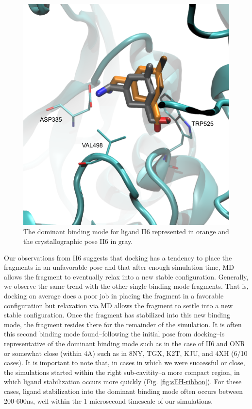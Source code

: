 \begin{figure}
    \centering
    \includegraphics[width=\linewidth]{chapter5/II6/BR-II6_1-pcca2-CL.png}
    \caption[Ligand II6 with crystal structure]{The dominant binding mode for ligand II6 represented in orange and the crystallographic pose II6 in gray.}
    \label{fig:II6_pcca2}
\end{figure}

Our observations from II6 suggests that docking has a tendency to place the fragments in an unfavorable pose and that after enough simulation time, MD allows the fragment to eventually relax into a new stable configuration.
Generally, we observe the same trend with the other single binding mode fragments.
That is, docking on average does a poor job in placing the fragment in a favorable configuration but relaxation via MD allows the fragment to settle into a new stable configuration.
Once the fragment has stabilized into this new binding mode, the fragment resides there for the remainder of the simulation.
It is often this second binding mode found--following the initial pose from docking--is representative of the dominant binding mode such as in the case of II6 and ONR or somewhat close (within 4A) such as in 8NY, TGX, K2T, KJU, and 4XH (6/10 cases).
It is important to note that, in cases in which we were successful or close, the simulations started within the right sub-cavitity--a more compact region, in which ligand stabilization occurs more quickly (Fig. \ref{fig:sEH-ribbon}).
For these cases, ligand stabilization into the dominant binding mode often occurs between 200-600ns, well within the 1 microsecond timescale of our simulations.  

